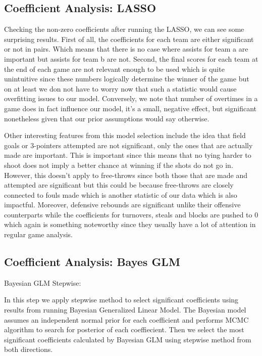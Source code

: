\documentclass{article} %
\begin{document}
\subsection{Coefficient Analysis: LASSO}

Checking the non-zero coefficients after running the LASSO, we can see some surprising results. 
First of all, the coefficients for each team are either significant or not in pairs. Which means that there is no case where assists for team a are important but assists for team b are not. Second, the final scores for each team at the end of each game are not relevant enough to be used which is quite unintuitive since these numbers logically determine the winner of the game but on at least we don not have to worry now that such a statistic would cause overfitting issues to our model. Conversely, we note that number of overtimes in a game does in fact influence our model, it's a small, negative effect, but significant nonetheless given that our prior assumptions would say otherwise. \

Other interesting features from this model selection include the idea that field goals or 3-pointers attempted are not significant, only the ones that are actually made are important. This is important since this means that no tying harder to shoot does not imply a better chance at winning if the shots do not go in. However, this doesn't apply to free-throws since both those that are made and attempted are significant but this could be because free-throws are closely connected to fouls made which is another statistic of our data which is also impactful. Moreover, defensive rebounds are significant unlike their offensive counterparts while the coefficients for turnovers, steals and blocks are pushed to 0 which again is something noteworthy since they usually have a lot of attention in regular game analysis.\

\subsection{Coefficient Analysis: Bayes GLM}

Bayesian GLM Stepwise:

In this step we apply stepwise method to select significant coefficients using results from running Bayesian Generalized Linear Model. The Bayesian model assumes an independent normal prior for each coefficient and performs MCMC algorithm to search for posterior of each coeffiecient. Then we select the most significant coefficients calculated by Bayesian GLM using stepwise method from both directions.
\end{document}
